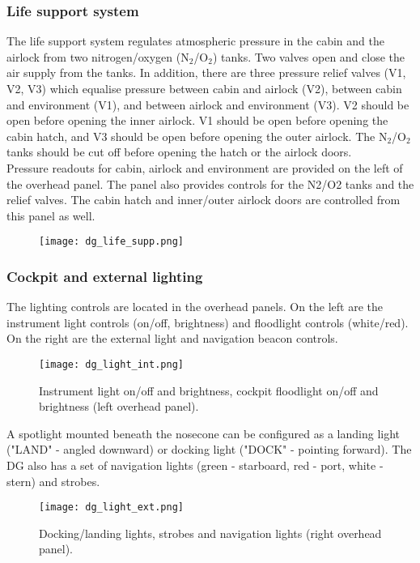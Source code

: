 \documentclass[Orbiter User Manual.tex]{subfiles}
\begin{document}
\subsubsection{Life support system}
The life support system regulates atmospheric pressure in the cabin and the airlock from two nitrogen/oxygen (N$_{2}$/O$_{2}$) tanks. Two valves open and close the air supply from the tanks. In addition, there are three pressure relief valves (V1, V2, V3) which equalise pressure between cabin and airlock (V2), between cabin and environment (V1), and between airlock and environment (V3). V2 should be open before opening the inner airlock. V1 should be open before opening the cabin hatch, and V3 should be open before opening the outer airlock. The N$_{2}$/O$_{2}$ tanks should be cut off before opening the hatch or the airlock doors.\\
Pressure readouts for cabin, airlock and environment are provided on the left of the overhead panel. The panel also provides controls for the N2/O2 tanks and the relief valves. The cabin hatch and inner/outer airlock doors are controlled from this panel as well.

\begin{figure}[H]
  \centering
  \texttt{[image: dg\_life\_supp.png]}
\end{figure}

\subsubsection{Cockpit and external lighting}
The lighting controls are located in the overhead panels. On the left are the instrument light controls (on/off, brightness) and floodlight controls (white/red). On the right are the external light and navigation beacon controls.

\begin{figure}[H]
  \centering
  \texttt{[image: dg\_light\_int.png]}
  \caption{Instrument light on/off and brightness, cockpit floodlight on/off and brightness (left overhead panel).}
\end{figure}

\noindent
A spotlight mounted beneath the nosecone can be configured as a landing light ("LAND" - angled downward) or docking light ("DOCK" - pointing forward). The DG also has a set of navigation lights (green - starboard, red - port, white - stern) and strobes.

\begin{figure}[H]
  \centering
  \texttt{[image: dg\_light\_ext.png]}
  \caption{Docking/landing lights, strobes and navigation lights (right overhead panel).}
\end{figure}
\end{document}
